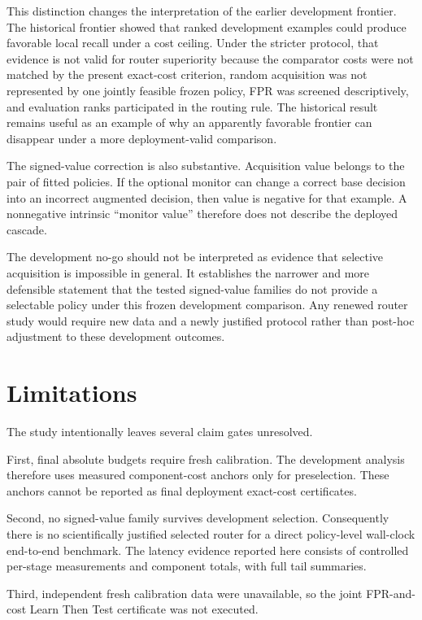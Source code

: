 \documentclass[11pt]{article}
\begin{document}
This distinction changes the interpretation of the earlier
development frontier. The historical frontier showed that ranked
development examples could produce favorable local recall under a
cost ceiling. Under the stricter protocol, that evidence is not
valid for router superiority because the comparator costs were not
matched by the present exact-cost criterion, random acquisition was
not represented by one jointly feasible frozen policy, FPR was
screened descriptively, and evaluation ranks participated in the
routing rule. The historical result remains useful as an example of
why an apparently favorable frontier can disappear under a more
deployment-valid comparison.

The signed-value correction is also substantive. Acquisition value
belongs to the pair of fitted policies. If the optional monitor can
change a correct base decision into an incorrect augmented decision,
then value is negative for that example. A nonnegative intrinsic
``monitor value'' therefore does not describe the deployed cascade.

The development no-go should not be interpreted as evidence that
selective acquisition is impossible in general. It establishes the
narrower and more defensible statement that the tested signed-value
families do not provide a selectable policy under this frozen
development comparison. Any renewed router study would require new
data and a newly justified protocol rather than post-hoc adjustment
to these development outcomes.

\section{Limitations}

The study intentionally leaves several claim gates unresolved.

First, final absolute budgets require fresh calibration. The
development analysis therefore uses measured component-cost anchors
only for preselection. These anchors cannot be reported as final
deployment exact-cost certificates.

Second, no signed-value family survives development selection.
Consequently there is no scientifically justified selected router
for a direct policy-level wall-clock end-to-end benchmark. The
latency evidence reported here consists of controlled per-stage
measurements and component totals, with full tail summaries.

Third, independent fresh calibration data were unavailable, so the
joint FPR-and-cost Learn Then Test certificate was not executed.
\end{document}
